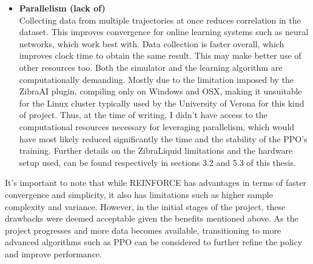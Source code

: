 \begin{itemize}
\item {\bf Parallelism (lack of)}\\
Collecting data from multiple trajectories at once reduces correlation in the dataset. This improves convergence for online learning systems such as neural networks, which work best with. \cite{mnih2016}
Data collection is faster overall, which improves clock time to obtain the same result. This may make better use of other resources too.\cite{mnih2016}
Both the simulator and the learning algorithm are computationally demanding. Mostly due to the limitation imposed by the ZibraAI plugin, compiling only on Windows and OSX, making it unsuitable for the Linux cluster typically used by the University of Verona for this kind of project. Thus, at the time of writing, I didn’t have access to the computational resources necessary for leveraging parallelism, which would have most likely reduced significantly the time and the stability of the PPO’s training. Further details on the ZibraLiquid limitations and the hardware setup used, can be found respectively in sections 3.2 and 5.3 of this thesis.

\end{itemize}

\begin{textblock}
It's important to note that while REINFORCE has advantages in terms of faster convergence and simplicity, it also has limitations such as higher sample complexity and variance. However, in the initial stages of the project, these drawbacks were deemed acceptable given the benefits mentioned above. As the project progresses and more data becomes available, transitioning to more advanced algorithms such as PPO can be considered to further refine the policy and improve performance.
\end{textblock}

\blankpage
